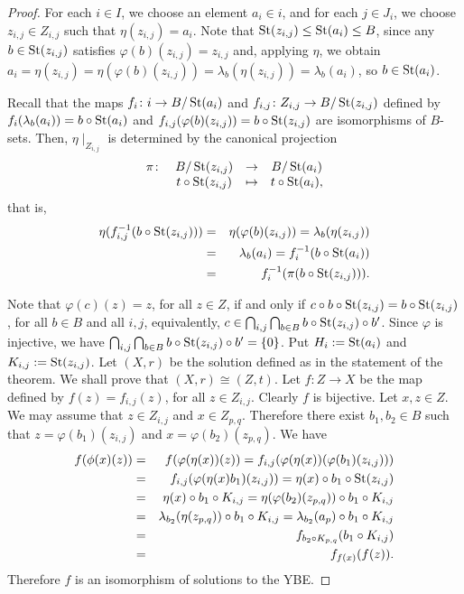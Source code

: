 \begin{proof}
	For each $i\in I$, we choose an element $a_i\in i$, and for each
	$j\in J_i$, we choose $z_{i,j}\in Z_{i,j}$ such that
	$\eta(z_{i,j})=a_i$. Note that  $\operatorname{St}(z_{i,j})\leq \operatorname{St}(a_i)\leq B$,
	since any $b\in \operatorname{St}(z_{i,j})$ satisfies $\varphi(b)(z_{i,j})=z_{i,j}$
	and, applying $\eta$, we obtain
	$a_i=\eta(z_{i,j})=\eta(\varphi(b)(z_{i,j}))=\lambda_b(\eta(z_{i,j}))=\lambda_b(a_i)$,
	so $b\in \operatorname{St}(a_i)$.
	
	Recall that the maps $f_i\colon i\rightarrow B/\operatorname{St}(a_i)$ and
	$f_{i,j}\colon Z_{i,j}\rightarrow B/\operatorname{St}(z_{i,j})$ defined by
	$f_{i}(\lambda_b(a_i))= b\circ \operatorname{St}(a_i)$ and $f_{i,j}(\varphi(b)(z_{i,j}))=
	b\circ \operatorname{St}(z_{i,j})$ are isomorphisms of $B$-sets.
	Then,
	$\eta\mid_{Z_{i,j}}$ is determined by the canonical projection
	$$
	\begin{array}{cccc}
		\pi \colon &B/\operatorname{St}(z_{i,j})&\to  &B/\operatorname{St}(a_i)\\
		&t\circ\operatorname{St}(z_{i,j})&\mapsto &t\circ \operatorname{St}(a_i),
	\end{array}
	$$
	that is, \begin{eqnarray*}
		\eta(f_{i,j}^{-1}(b\circ\operatorname{St}(z_{i,j})))&=&\eta(\varphi(b)(z_{i,j}))=\lambda_b(\eta(z_{i,j}))\\
		&=&
		\lambda_b(a_{i})=f_i^{-1}(b\circ\operatorname{St}(a_i))\\
		&=&f_i^{-1}(\pi(b\circ \operatorname{St}(z_{i,j})))  .\end{eqnarray*}
	
	Note that $\varphi(c)(z)=z$, for all $z\in Z$, if and only if
	$c\circ b\circ \operatorname{St}(z_{i,j})=b\circ\operatorname{St}(z_{i,j})$, for all $b\in B$ and all $i,j$,
	equivalently,  $c\in\bigcap_{i,j} \bigcap_{b\in
		B}b\circ\operatorname{St}(z_{i,j})\circ b'$. Since $\varphi$ is injective, we have
	$\bigcap_{i,j} \bigcap_{b\in B}b\circ\operatorname{St}(z_{i,j})\circ b'=\{ 0\}$.  Put
	$H_i:=\operatorname{St}(a_i)$ and $K_{i,j}:=\operatorname{St}(z_{i,j})$.  Let $(X,r)$ be the
	solution defined as in the statement of the theorem. We shall
	prove that $(X,r)\cong (Z,t)$. Let $f\colon Z\to X$ be
	the map defined by $f(z)=f_{i,j}(z)$, for all $z\in Z_{i,j}$.
	Clearly $f$ is bijective. Let $x,z\in Z$. We may assume that $z\in
	Z_{i,j}$ and $x\in Z_{p,q}$. Therefore there exist $b_1,b_2\in B$
	such that $z=\varphi(b_1)(z_{i,j})$ and $x=\varphi(b_2)(z_{p,q})$. We
	have
	\begin{eqnarray*}
		f(\phi(x)(z))&=&f(\varphi(\eta(x))(z))=f_{i,j}(\varphi(\eta(x))(\varphi(b_1)(z_{i,j})))\\
		&=&f_{i,j}(\varphi(\eta(x)b_1)(z_{i,j}))=\eta(x)\circ b_1\circ \operatorname{St}(z_{i,j})\\
		&=&\eta(x)\circ b_1\circ K_{i,j}=\eta(\varphi(b_2)(z_{p,q}))\circ b_1\circ K_{i,j}\\
		&=&\lambda_{b_2}(\eta(z_{p,q}))\circ b_1\circ K_{i,j}=\lambda_{b_2}(a_p)\circ b_1\circ K_{i,j}\\
		&=&f_{b_2\circ K_{p,q}}(b_1\circ K_{i,j})\\
		&=&f_{f(x)}(f(z)).
	\end{eqnarray*}
	Therefore $f$ is an isomorphism of solutions to the YBE.
\end{proof}



